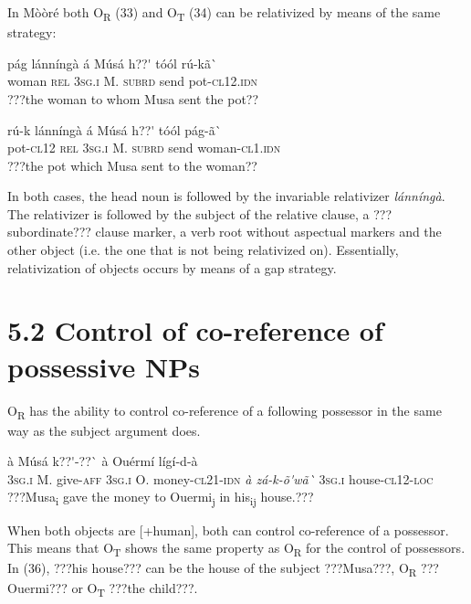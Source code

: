 \documentclass[output=paper]{langsci/langscibook}
\begin{document}

In Mòòré both O\textsubscript{R} (33) and O\textsubscript{T} (34) can be relativized by means of the same strategy:


\ea \gll 
\label{bkm:Ref424233046}pág    lánníngà  á    Músá  h??\'{ }    tóól  rú-kã\`{ }
\\
%
woman  \textsc{rel}    \textsc{3sg.i  }  M.  \textsc{subrd}    send  pot-\textsc{cl12.idn}
\\\glt
???the woman to whom Musa sent the pot??
\z


\ea \gll 
\label{bkm:Ref424233055}rú-k    lánníngà  á    Músá  h??\'{ }    tóól  pág-ã\`{ }
\\
%
pot-\textsc{cl12}  \textsc{rel}    \textsc{3sg.i  }  M.  \textsc{subrd}    send  woman-\textsc{cl1.idn}
\\\glt
???the pot which Musa sent to the woman??
\z

In both cases, the head noun is followed by the invariable relativizer \textit{lánníngà}. The relativizer is followed by the subject of the relative clause, a ???subordinate??? clause marker, a verb root without aspectual markers and the other object (i.e. the one that is not being relativized on). Essentially, relativization of objects occurs by means of a gap strategy. 

\section{5.2 Control of co{}-reference of possessive NPs}

O\textsubscript{R} has the ability to control co-reference of a following possessor{ }in the same way as the subject argument does.


\ea \gll 
à    Músá  k??\'{ }-??\`{ }  à    Ouérmí  lígí-d-à    
\\
%
\textsc{3sg.i}  M.  give-\textsc{aff  3sg.i}    O.            money-\textsc{cl21-idn}     \textit{à    zá-k-\~{o}\'{ }wã\`{ }}  
%
  \textsc{3sg.i  }  house-\textsc{cl12-loc}
\\\glt
???Musa\textsubscript{i} gave the money to Ouermi\textsubscript{j} in his\textsubscript{ij} house.???
\z

When both objects are [+human], both can control co-reference of a possessor. This means that O\textsubscript{T }shows the same property as O\textsubscript{R} for the control of possessors. In (36), ???his house??? can be the house of the subject ???Musa???, O\textsubscript{R} ???Ouermi??? or O\textsubscript{T} ???the child???.
\end{document}
